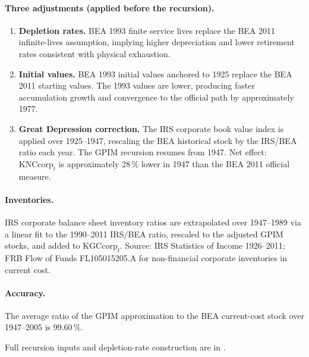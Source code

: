 \paragraph{Three adjustments (applied before the recursion).}

\begin{enumerate}
	\item \textbf{Depletion rates.} BEA 1993 finite service lives replace
	the BEA 2011 infinite-lives assumption, implying higher depreciation
	and lower retirement rates consistent with physical exhaustion.
	
	\item \textbf{Initial values.} BEA 1993 initial values anchored to
	1925 replace the BEA 2011 starting values. The 1993 values are lower,
	producing faster accumulation growth and convergence to the official
	path by approximately 1977.
	
	\item \textbf{Great Depression correction.} The IRS corporate book
	value index \citep[Series~V~115, pp.~924--926]{UScensus1975} is applied
	over 1925--1947, rescaling the BEA historical stock by the IRS/BEA
	ratio each year. The GPIM recursion resumes from 1947. Net effect:
	$\text{KNCcorp}_t$ is approximately 28\,\% lower in 1947 than the BEA
	2011 official measure.
\end{enumerate}

\paragraph{Inventories.}
IRS corporate balance sheet inventory ratios are extrapolated over
1947--1989 via a linear fit to the 1990--2011 IRS/BEA ratio, rescaled to
the adjusted GPIM stocks, and added to $\text{KGCcorp}_t$. Source:
IRS Statistics of Income 1926--2011; FRB Flow of Funds FL105015205.A for
non-financial corporate inventories in current cost.

\paragraph{Accuracy.}
The average ratio of the GPIM approximation to the BEA current-cost stock
over 1947--2005 is 99.60\,\%.

\noindent Full recursion inputs and depletion-rate construction are in
\citet[Appendix~6.7, Section~V; Appendix Table~6.8.II.3]{Shaikh2016}.


